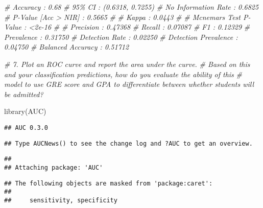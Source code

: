 \documentclass[
]{article}
\newenvironment{Shaded}{\begin{snugshade}}{\end{snugshade}}
\newcommand{\CommentTok}[1]{\textcolor[rgb]{0.56,0.35,0.01}{\textit{#1}}}
\newcommand{\FunctionTok}[1]{\textcolor[rgb]{0.00,0.00,0.00}{#1}}
\newcommand{\NormalTok}[1]{#1}
\begin{document}
\begin{Shaded}
\begin{Highlighting}[]
  \CommentTok{\# Accuracy : 0.68            }
  \CommentTok{\# 95\% CI : (0.6318, 0.7255)}
  \CommentTok{\# No Information Rate : 0.6825          }
  \CommentTok{\# P{-}Value [Acc \textgreater{} NIR] : 0.5665          }
  \CommentTok{\# }
  \CommentTok{\# Kappa : 0.0443          }
  \CommentTok{\# }
  \CommentTok{\# Mcnemar\textquotesingle{}s Test P{-}Value : \textless{}2e{-}16          }
  \CommentTok{\#                                           }
  \CommentTok{\#               Precision : 0.47368         }
  \CommentTok{\#                  Recall : 0.07087         }
  \CommentTok{\#                      F1 : 0.12329         }
  \CommentTok{\#              Prevalence : 0.31750         }
  \CommentTok{\#          Detection Rate : 0.02250         }
  \CommentTok{\#    Detection Prevalence : 0.04750         }
  \CommentTok{\#       Balanced Accuracy : 0.51712 }


\CommentTok{\# 7.    Plot an ROC curve and report the area under the curve. }
\CommentTok{\#     Based on this and your classification predictions, how do you evaluate the ability of this }
\CommentTok{\#     model to use GRE score and GPA to differentiate between whether students will be admitted?  }
\end{Highlighting}
\end{Shaded}

\begin{Shaded}
\begin{Highlighting}[]
\FunctionTok{library}\NormalTok{(AUC)}
\end{Highlighting}
\end{Shaded}

\begin{verbatim}
## AUC 0.3.0
\end{verbatim}

\begin{verbatim}
## Type AUCNews() to see the change log and ?AUC to get an overview.
\end{verbatim}

\begin{verbatim}
## 
## Attaching package: 'AUC'
\end{verbatim}

\begin{verbatim}
## The following objects are masked from 'package:caret':
## 
##     sensitivity, specificity
\end{verbatim}
\end{document}
